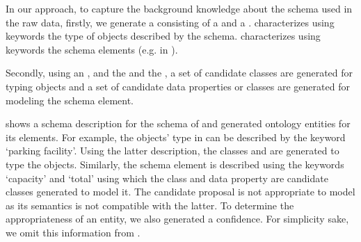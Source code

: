 In our approach, to capture the background knowledge about the schema used in the raw data, firstly, we generate a  consisting of a  and a .  characterizes using keywords the type of objects described by the schema.  characterizes using keywords the schema elements (e.g.  in ).   


Secondly, using an , and the  and the , a set of candidate classes are generated for typing objects and a set of candidate data properties or classes are generated for modeling the schema element. 

 shows a schema description for the schema of  and generated ontology entities for its elements. For example, the objects' type in  can be described by the keyword `parking facility'. Using the latter description, the classes  and  are generated to type the objects. Similarly, the schema element  is described using the keywords `capacity' and `total' using which the class  and data property  are candidate classes generated to model it. The candidate proposal  is not appropriate to model  as its semantics is not compatible with the latter. To determine the appropriateness of an entity, we also generated a confidence. For simplicity sake, we omit this information from .

